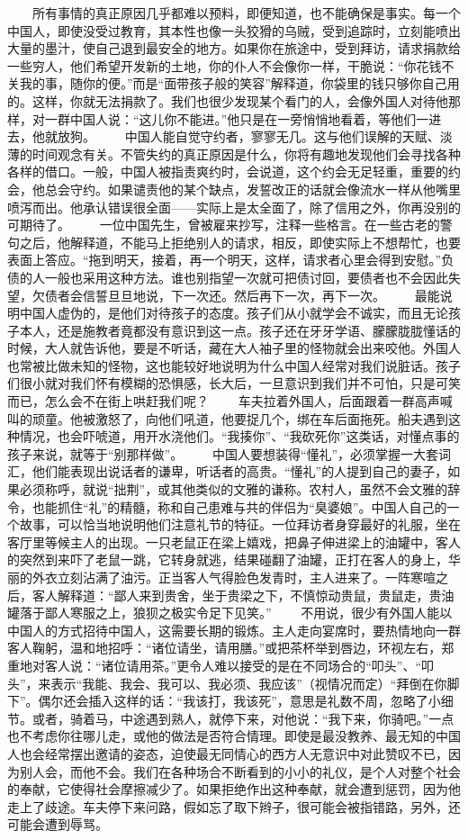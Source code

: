\documentclass[12pt,oneside]{book}
\begin{document}
\begin{common-format}
　　所有事情的真正原因几乎都难以预料，即便知道，也不能确保是事实。每一个中国人，即使没受过教育，其本性也像一头狡猾的乌贼，受到追踪时，立刻能喷出大量的墨汁，使自己退到最安全的地方。如果你在旅途中，受到拜访，请求捐款给一些穷人，他们希望开发新的土地，你的仆人不会像你一样，干脆说：“你花钱不关我的事，随你的便。”而是“面带孩子般的笑容”解释道，你袋里的钱只够你自己用的。这样，你就无法捐款了。我们也很少发现某个看门的人，会像外国人对待他那样，对一群中国人说：“这儿你不能进。”他只是在一旁悄悄地看着，等他们一进去，他就放狗。 
　　中国人能自觉守约者，寥寥无几。这与他们误解的天赋、淡薄的时间观念有关。不管失约的真正原因是什么，你将有趣地发现他们会寻找各种各样的借口。一般，中国人被指责爽约时，会说道，这个约会无足轻重，重要的约会，他总会守约。如果谴责他的某个缺点，发誓改正的话就会像流水一样从他嘴里喷泻而出。他承认错误很全面——实际上是太全面了，除了信用之外，你再没别的可期待了。 
　　一位中国先生，曾被雇来抄写，注释一些格言。在一些古老的警句之后，他解释道，不能马上拒绝别人的请求，相反，即使实际上不想帮忙，也要表面上答应。“拖到明天，接着，再一个明天，这样，请求者心里会得到安慰。”负债的人一般也采用这种方法。谁也别指望一次就可把债讨回，要债者也不会因此失望，欠债者会信誓旦旦地说，下一次还。然后再下一次，再下一次。 
　　最能说明中国人虚伪的，是他们对待孩子的态度。孩子们从小就学会不诚实，而且无论孩子本人，还是施教者竟都没有意识到这一点。孩子还在牙牙学语、朦朦胧胧懂话的时候，大人就告诉他，要是不听话，藏在大人袖子里的怪物就会出来咬他。外国人也常被比做未知的怪物，这也能较好地说明为什么中国人经常对我们说脏话。孩子们很小就对我们怀有模糊的恐惧感，长大后，一旦意识到我们并不可怕，只是可笑而已，怎么会不在街上哄赶我们呢？ 
　　车夫拉着外国人，后面跟着一群高声喊叫的顽童。他被激怒了，向他们吼道，他要捉几个，绑在车后面拖死。船夫遇到这种情况，也会吓唬道，用开水浇他们。“我揍你”、“我砍死你”这类话，对懂点事的孩子来说，就等于“别那样做”。 
　　中国人要想装得“懂礼”，必须掌握一大套词汇，他们能表现出说话者的谦卑，听话者的高贵。“懂礼”的人提到自己的妻子，如果必须称呼，就说“拙荆”，或其他类似的文雅的谦称。农村人，虽然不会文雅的辞令，也能抓住“礼”的精髓，称和自己患难与共的伴侣为“臭婆娘”。中国人自己的一个故事，可以恰当地说明他们注意礼节的特征。一位拜访者身穿最好的礼服，坐在客厅里等候主人的出现。一只老鼠正在梁上嬉戏，把鼻子伸进梁上的油罐中，客人的突然到来吓了老鼠一跳，它转身就逃，结果碰翻了油罐，正打在客人的身上，华丽的外衣立刻沾满了油污。正当客人气得脸色发青时，主人进来了。一阵寒喧之后，客人解释道：“鄙人来到贵舍，坐于贵梁之下，不慎惊动贵鼠，贵鼠走，贵油罐落于鄙人寒服之上，狼狈之极实令足下见笑。” 
　　不用说，很少有外国人能以中国人的方式招待中国人，这需要长期的锻炼。主人走向宴席时，要热情地向一群客人鞠躬，温和地招呼：“诸位请坐，请用膳。”或把茶杯举到唇边，环视左右，郑重地对客人说：“诸位请用茶。”更令人难以接受的是在不同场合的“叩头”、“叩头”，来表示“我能、我会、我可以、我必须、我应该”（视情况而定）“拜倒在你脚下”。偶尔还会插入这样的话：“我该打，我该死”，意思是礼数不周，忽略了小细节。或者，骑着马，中途遇到熟人，就停下来，对他说：“我下来，你骑吧。”一点也不考虑你往哪儿走，或他的做法是否符合情理。即使是最没教养、最无知的中国人也会经常摆出邀请的姿态，迫使最无同情心的西方人无意识中对此赞叹不已，因为别人会，而他不会。我们在各种场合不断看到的小小的礼仪，是个人对整个社会的奉献，它使得社会摩擦减少了。如果拒绝作出这种奉献，就会遭到惩罚，因为他走上了歧途。车夫停下来问路，假如忘了取下辫子，很可能会被指错路，另外，还可能会遭到辱骂。 

\end{common-format}
\end{document}
